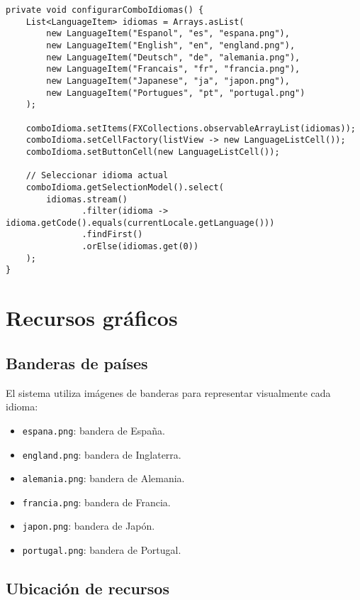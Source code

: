 \begin{lstlisting}[caption=Configuración del selector de idiomas]
private void configurarComboIdiomas() {
    List<LanguageItem> idiomas = Arrays.asList(
        new LanguageItem("Espanol", "es", "espana.png"),
        new LanguageItem("English", "en", "england.png"),
        new LanguageItem("Deutsch", "de", "alemania.png"),
        new LanguageItem("Francais", "fr", "francia.png"),
        new LanguageItem("Japanese", "ja", "japon.png"),
        new LanguageItem("Portugues", "pt", "portugal.png")
    );
    
    comboIdioma.setItems(FXCollections.observableArrayList(idiomas));
    comboIdioma.setCellFactory(listView -> new LanguageListCell());
    comboIdioma.setButtonCell(new LanguageListCell());
    
    // Seleccionar idioma actual
    comboIdioma.getSelectionModel().select(
        idiomas.stream()
               .filter(idioma -> idioma.getCode().equals(currentLocale.getLanguage()))
               .findFirst()
               .orElse(idiomas.get(0))
    );
}
\end{lstlisting}

\section{Recursos gráficos}

\subsection{Banderas de países}

El sistema utiliza imágenes de banderas para representar visualmente cada idioma:

\begin{itemize}
    \item \texttt{espana.png}: bandera de España.
    \item \texttt{england.png}: bandera de Inglaterra.
    \item \texttt{alemania.png}: bandera de Alemania.
    \item \texttt{francia.png}: bandera de Francia.
    \item \texttt{japon.png}: bandera de Japón.
    \item \texttt{portugal.png}: bandera de Portugal.
\end{itemize}

\subsection{Ubicación de recursos}

